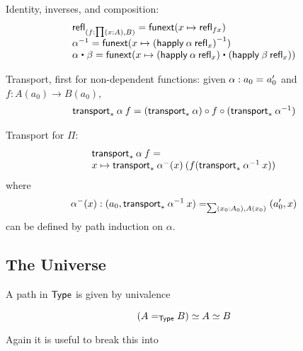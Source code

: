 Identity, inverses, and composition:
\[
\begin{array}{l}
\refl{(f : \prd{x:A} B)} = \funext(x \mapsto \refl{f x}) \\
\opp{\alpha} = \funext (x \mapsto \opp{(\happly \: {\alpha} \: {\refl x})})  \\
{\alpha} \ct \beta = \funext (x \mapsto {(\happly \: {\alpha} \: {\refl x}) \ct (\happly \: {\beta} \: {\refl x})})  \\
\end{array}
\]

\newcommand{\fcomp}{\circ}

Transport, first for non-dependent functions: given $\alpha : \id {a_0} {a_0'}$
and $f : A(a_0) \to B(a_0)$, 
\[
\begin{array}{l}
\transport{x_0:A_0 \mapsto A(x_0) \to B(x_0)}{\alpha} \: f = 
   (\transport{x_0:A_0 \mapsto B(x_0)}{\alpha}) \fcomp f \fcomp (\transport{x:A_0 \mapsto A(x_0)}{\opp \alpha})
\end{array}
\]

Transport for $\Pi$:  
\[
\begin{array}{l}
\transport{x_0:A_0 \mapsto \prd{x : A(x_0)} B(x_0)}{\alpha} \: f =  \\
   x \mapsto 
   \transport{(p : \sm {x_0:A_0} A) \mapsto B(\proj{1} \: p, \proj{2} \: p)}{\alpha^{\mathord{-}}(x) } 
      \: (f (\transport{x:A_0 \mapsto A(x)}{\opp \alpha}\:  x))
\end{array}
\]
where 
\[
\alpha^-(x) : \id[\sm {x_0:A_0} A(x_0)] {(a_0 , \transport{x_0 \mapsto A(x_0)} {\opp \alpha} \: x)} {(a_0' , x)}
\]
can be defined by path induction on $\alpha$.  

\subsection{The Universe}

A path in $\type$ is given by univalence

\[
\eqv{(\id[\type]{A}{B})}{\eqv A B}
\]

Again it is useful to break this into 

\newcommand\isequiv{\mathsf{isEquiv}}

